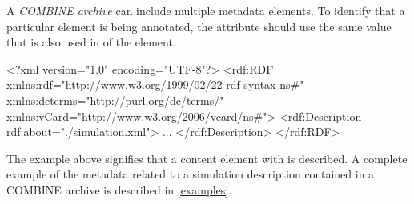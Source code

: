 A \textit{COMBINE archive} can include multiple metadata elements. To 
identify that a particular \Content element is being annotated, the 
 attribute should use the same value that is also used 
in  of the \Content element. 


\begin{example}
<?xml version="1.0" encoding="UTF-8"?>
<rdf:RDF xmlns:rdf="http://www.w3.org/1999/02/22-rdf-syntax-ns#" 
         xmlns:dcterms="http://purl.org/dc/terms/" 
				 xmlns:vCard="http://www.w3.org/2006/vcard/ns#">
   <rdf:Description rdf:about="./simulation.xml">
   ...
	 </rdf:Description>
</rdf:RDF>
\end{example}

The example above signifies that a content element with 
 is described. A complete example of 
the metadata related to a simulation description contained in a COMBINE 
archive is described in \ref{examples}. 


